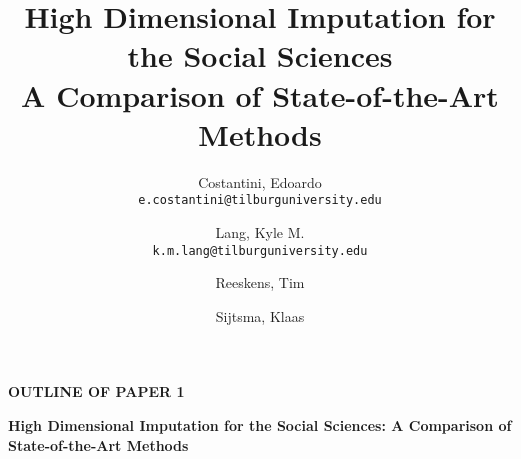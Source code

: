 \documentclass[11pt]{article}
\title{High Dimensional Imputation for the Social Sciences\\ \Large A Comparison of State-of-the-Art Methods}
\author{
  Costantini, Edoardo\\
  \small\texttt{e.costantini@tilburguniversity.edu}
  \and
  Lang, Kyle M.\\
  \small\texttt{k.m.lang@tilburguniversity.edu}
  \and  
  Reeskens, Tim \\
  \and  
  Sijtsma, Klaas\\
}
\newcommand{\pathBIB}{../../../statsLib}
\begin{document}

\begin{center}
\textbf{OUTLINE OF PAPER 1}

\textbf{High Dimensional Imputation for the Social Sciences: A Comparison of State-of-the-Art Methods}

\end{center}



\pagebreak

\maketitle



























\pagebreak


\end{document}
